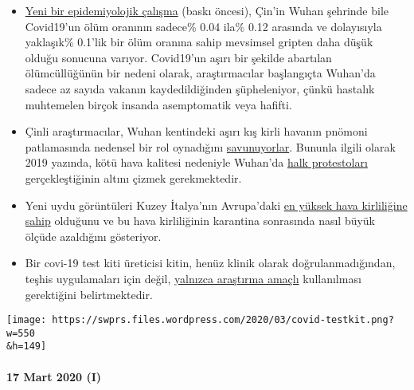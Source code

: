 \begin{itemize}
\tightlist
\item
  \href{https://www.medrxiv.org/content/10.1101/2020.02.12.20022434v2}{Yeni
  bir epidemiyolojik çalışma} (baskı öncesi), Çin'in Wuhan şehrinde bile
  Covid19'un ölüm oranının sadece\% 0.04 ila\% 0.12 arasında ve
  dolayısıyla yaklaşık\% 0.1'lik bir ölüm oranına sahip mevsimsel
  gripten daha düşük olduğu sonucuna varıyor. Covid19'un aşırı bir
  şekilde abartılan ölümcüllüğünün bir nedeni olarak, araştırmacılar
  başlangıçta Wuhan'da sadece az sayıda vakanın kaydedildiğinden
  şüpheleniyor, çünkü hastalık muhtemelen birçok insanda asemptomatik
  veya hafifti.
\item
  Çinli araştırmacılar, Wuhan kentindeki aşırı kış kirli havanın pnömoni
  patlamasında nedensel bir rol oynadığını
  \href{https://www.eurasiareview.com/01022020-polluted-air-could-be-an-important-cause-of-wuhan-pneumonia-oped/}{savunuyorlar}.
  Bununla ilgili olarak 2019 yazında, kötü hava kalitesi nedeniyle
  Wuhan'da
  \href{https://www.cnn.com/2019/07/10/asia/china-wuhan-pollution-problems-intl-hnk/index.html}{halk
  protestoları} gerçekleştiğinin altını çizmek gerekmektedir.
\item
  Yeni uydu görüntüleri Kuzey İtalya'nın Avrupa'daki
  \href{https://twitter.com/esa/status/1238480433047916545}{en yüksek
  hava kirliliğine sahip} olduğunu ve bu hava kirliliğinin karantina
  sonrasında nasıl büyük ölçüde azaldığını gösteriyor.
\item
  Bir covi-19 test kiti üreticisi kitin, henüz klinik olarak
  doğrulanmadığından, teşhis uygulamaları için değil,
  \href{https://www.creative-diagnostics.com/sars-cov-2-coronavirus-multiplex-rt-qpcr-kit-277854-457.htm}{yalnızca
  araştırma amaçlı} kullanılması gerektiğini belirtmektedir.\\
\end{itemize}

\texttt{[image: https://swprs.files.wordpress.com/2020/03/covid-testkit.png?w=550\\\&h=149]}

\hypertarget{17-mart-2020-i-}{%
\paragraph{17 Mart 2020 (I) }\label{17-mart-2020-i-}}

